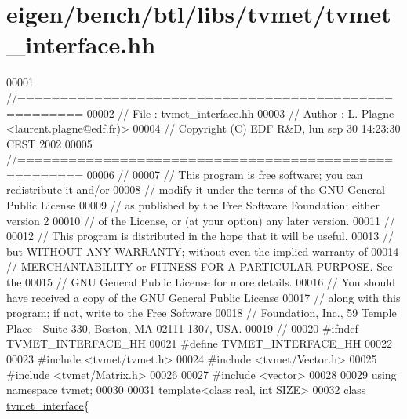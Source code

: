 \hypertarget{eigen_2bench_2btl_2libs_2tvmet_2tvmet__interface_8hh_source}{}\section{eigen/bench/btl/libs/tvmet/tvmet\+\_\+interface.hh}
\label{eigen_2bench_2btl_2libs_2tvmet_2tvmet__interface_8hh_source}

\begin{DoxyCode}
00001 \textcolor{comment}{//=====================================================}
00002 \textcolor{comment}{// File   :  tvmet\_interface.hh}
00003 \textcolor{comment}{// Author :  L. Plagne <laurent.plagne@edf.fr)>}
00004 \textcolor{comment}{// Copyright (C) EDF R&D,  lun sep 30 14:23:30 CEST 2002}
00005 \textcolor{comment}{//=====================================================}
00006 \textcolor{comment}{//}
00007 \textcolor{comment}{// This program is free software; you can redistribute it and/or}
00008 \textcolor{comment}{// modify it under the terms of the GNU General Public License}
00009 \textcolor{comment}{// as published by the Free Software Foundation; either version 2}
00010 \textcolor{comment}{// of the License, or (at your option) any later version.}
00011 \textcolor{comment}{//}
00012 \textcolor{comment}{// This program is distributed in the hope that it will be useful,}
00013 \textcolor{comment}{// but WITHOUT ANY WARRANTY; without even the implied warranty of}
00014 \textcolor{comment}{// MERCHANTABILITY or FITNESS FOR A PARTICULAR PURPOSE.  See the}
00015 \textcolor{comment}{// GNU General Public License for more details.}
00016 \textcolor{comment}{// You should have received a copy of the GNU General Public License}
00017 \textcolor{comment}{// along with this program; if not, write to the Free Software}
00018 \textcolor{comment}{// Foundation, Inc., 59 Temple Place - Suite 330, Boston, MA  02111-1307, USA.}
00019 \textcolor{comment}{//}
00020 \textcolor{preprocessor}{#ifndef TVMET\_INTERFACE\_HH}
00021 \textcolor{preprocessor}{#define TVMET\_INTERFACE\_HH}
00022 
00023 \textcolor{preprocessor}{#include <tvmet/tvmet.h>}
00024 \textcolor{preprocessor}{#include <tvmet/Vector.h>}
00025 \textcolor{preprocessor}{#include <tvmet/Matrix.h>}
00026 
00027 \textcolor{preprocessor}{#include <vector>}
00028 
00029 \textcolor{keyword}{using namespace }\hyperlink{namespacetvmet}{tvmet};
00030 
00031 \textcolor{keyword}{template}<\textcolor{keyword}{class} real, \textcolor{keywordtype}{int} SIZE>
\hyperlink{classtvmet__interface}{00032} \textcolor{keyword}{class }\hyperlink{classtvmet__interface}{tvmet\_interface}\{

\end{DoxyCode}
